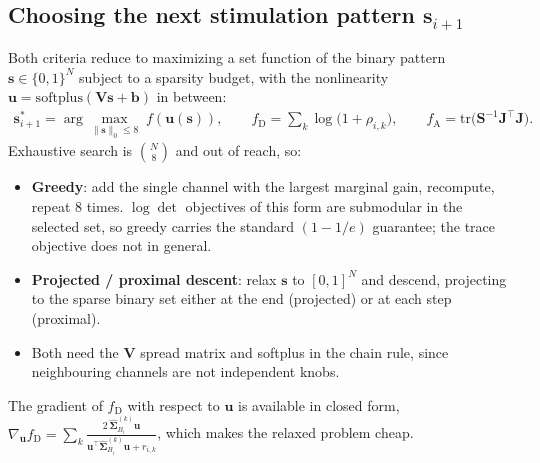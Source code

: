 \documentclass[11pt,letterpaper]{article} %
\newcommand{\inlinecomment}[1]{}
\begin{document}

\clearpage
\subsection*{Choosing the next stimulation pattern $\bm{s}_{i+1}$}

Both criteria reduce to maximizing a set function of the binary pattern $\bm{s}\in\{0,1\}^N$
subject to a sparsity budget, with the nonlinearity $\bm{u} = \mathrm{softplus}(\bm{V}\bm{s}+\bm{b})$
in between:
\begin{align*}
    \bm{s}_{i+1}^{*} = \arg\max_{\|\bm{s}\|_0 \le 8}\; f(\bm{u}(\bm{s})),
    \qquad
    f_{\mathrm{D}} = \sum_{k}\log\big(1+\rho_{i,k}\big),
    \qquad
    f_{\mathrm{A}} = \mathrm{tr}\big(\bm{S}^{-1}\bm{J}^\top\bm{J}\big).
\end{align*}
Exhaustive search is $\binom{N}{8}$ and out of reach, so:
\begin{itemize}[itemsep=0em, topsep=0.2em]
    \item \textbf{Greedy}: add the single channel with the largest marginal gain, recompute, repeat 8 times. $\log\det$ objectives of this form are submodular in the selected set, so greedy carries the standard $(1-1/e)$ guarantee; the trace objective does not in general.
    \item \textbf{Projected / proximal descent}: relax $\bm{s}$ to $[0,1]^N$ and descend, projecting to the sparse binary set either at the end (projected) or at each step (proximal).
    \item Both need the $\bm{V}$ spread matrix and softplus in the chain rule, since neighbouring channels are not independent knobs.
\end{itemize}
The gradient of $f_{\mathrm{D}}$ with respect to $\bm{u}$ is available in closed form,
$\nabla_{\bm{u}} f_{\mathrm{D}} = \sum_k \frac{2\,\hat{\bm{\Sigma}}_{B_i}^{(k)}\bm{u}}{\bm{u}^\top\hat{\bm{\Sigma}}_{B_i}^{(k)}\bm{u} + r_{i,k}}$,
which makes the relaxed problem cheap.
\end{document}
